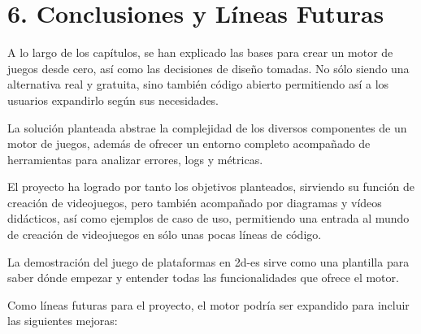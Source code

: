 \chapter*{6. Conclusiones y Líneas Futuras}\label{cap:conclusions}

A lo largo de los capítulos, se han explicado las bases para crear un motor de juegos desde cero, así como las decisiones
de diseño tomadas. No sólo siendo una alternativa real y gratuita, sino también código abierto permitiendo así a los usuarios
expandirlo según sus necesidades.

La solución planteada abstrae la complejidad de los diversos componentes de un motor de juegos, además de ofrecer un 
entorno completo acompañado de herramientas para analizar errores, logs y métricas.

El proyecto ha logrado por tanto los objetivos planteados, sirviendo su función de creación de videojuegos, pero también
acompañado por diagramas y vídeos didácticos, así como ejemplos de caso de uso, permitiendo una entrada al mundo de
creación de videojuegos en sólo unas pocas líneas de código.

La demostración del juego de plataformas en \gls{2d-es} sirve como una plantilla para saber dónde empezar y entender todas las 
funcionalidades que ofrece el motor.

Como líneas futuras para el proyecto, el motor podría ser expandido para incluir las siguientes mejoras:

